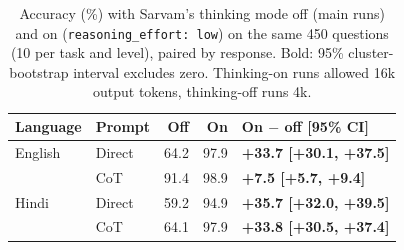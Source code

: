 \begin{table}[t]
\centering
\small
\setlength{\tabcolsep}{3.5pt}
\begin{tabular}{@{}llrrl@{}}
\toprule
Language & Prompt & Off & On & On $-$ off [95\% CI] \\
\midrule
English & Direct & 64.2 & 97.9 & \textbf{+33.7 [+30.1, +37.5]} \\
 & CoT & 91.4 & 98.9 & \textbf{+7.5 [+5.7, +9.4]} \\
Hindi & Direct & 59.2 & 94.9 & \textbf{+35.7 [+32.0, +39.5]} \\
 & CoT & 64.1 & 97.9 & \textbf{+33.8 [+30.5, +37.4]} \\
\bottomrule
\end{tabular}
\caption{Accuracy (\%) with Sarvam's thinking mode off (main runs) and on (\texttt{reasoning\_effort: low}) on the same 450 questions (10 per task and level), paired by response. Bold: 95\% cluster-bootstrap interval excludes zero. Thinking-on runs allowed 16k output tokens, thinking-off runs 4k.}
\label{tab:reasoning-on}
\end{table}
